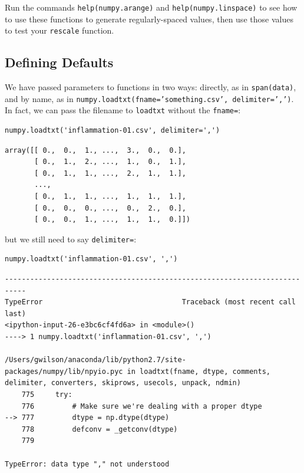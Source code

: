 \documentclass{book}
\begin{document}
\begin{challenge}
  Run the commands \texttt{help(numpy.arange)} and
  \texttt{help(numpy.linspace)} to see how to use these functions to
  generate regularly-spaced values, then use those values to test your
  \texttt{rescale} function.
\end{challenge}

\subsection{Defining Defaults}

We have passed parameters to functions in two ways: directly, as in
\texttt{span(data)}, and by name, as in
\texttt{numpy.loadtxt(fname='something.csv', delimiter=',')}. In fact,
we can pass the filename to \texttt{loadtxt} without the
\texttt{fname=}:

\begin{verbatim}
numpy.loadtxt('inflammation-01.csv', delimiter=',')
\end{verbatim}

\begin{verbatim}
array([[ 0.,  0.,  1., ...,  3.,  0.,  0.],
       [ 0.,  1.,  2., ...,  1.,  0.,  1.],
       [ 0.,  1.,  1., ...,  2.,  1.,  1.],
       ...,
       [ 0.,  1.,  1., ...,  1.,  1.,  1.],
       [ 0.,  0.,  0., ...,  0.,  2.,  0.],
       [ 0.,  0.,  1., ...,  1.,  1.,  0.]])
\end{verbatim}

but we still need to say \texttt{delimiter=}:

\begin{verbatim}
numpy.loadtxt('inflammation-01.csv', ',')
\end{verbatim}

\begin{verbatim}
---------------------------------------------------------------------------
TypeError                                 Traceback (most recent call last)
<ipython-input-26-e3bc6cf4fd6a> in <module>()
----> 1 numpy.loadtxt('inflammation-01.csv', ',')

/Users/gwilson/anaconda/lib/python2.7/site-packages/numpy/lib/npyio.pyc in loadtxt(fname, dtype, comments, delimiter, converters, skiprows, usecols, unpack, ndmin)
    775     try:
    776         # Make sure we're dealing with a proper dtype
--> 777         dtype = np.dtype(dtype)
    778         defconv = _getconv(dtype)
    779

TypeError: data type "," not understood
\end{verbatim}
\end{document}

